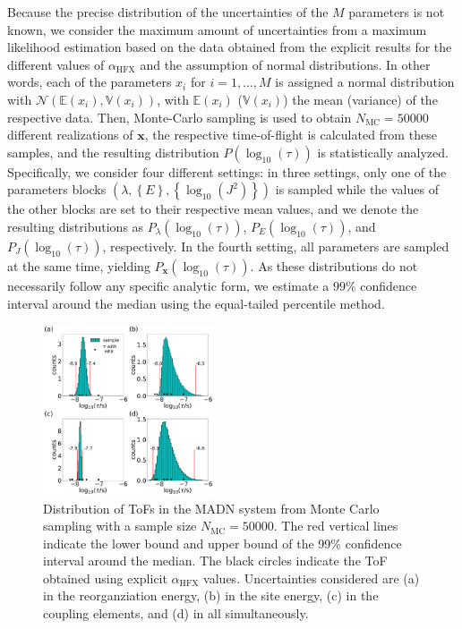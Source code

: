 \documentclass[%
 reprint,
superscriptaddress,
 amsmath,amssymb,
 aps,
prb,
floatfix
]{revtex4-2}
\newcommand{\ahfx}{\ensuremath{\alpha_\text{HFX}}\xspace}
\begin{document}
Because the precise distribution of the uncertainties of the $M$ parameters is not known, we consider the maximum amount of uncertainties from a maximum likelihood estimation based on the data obtained from the explicit results for the different values of \ahfx and the assumption of normal distributions. In other words, each of the parameters $x_i$ for $i=1,\ldots,M$ is assigned a normal distribution with $\mathcal{N}(\mathbb{E}(x_i),\mathbb{V}(x_i))$, with $\mathbb{E}(x_i)$ ($\mathbb{V}(x_i)$) the mean (variance) of the respective data. Then, Monte-Carlo sampling is used to obtain $N_\text{MC}=50000$ different realizations of $\mathbf{x}$, the respective time-of-flight is calculated from these samples, and the resulting distribution $P(\log_{10}(\tau))$ is statistically analyzed. Specifically, we consider four different settings: in three settings, only one of the parameters blocks $(\lambda,\left\{E\right\},\left\{\log_{10}(J^2)\right\})$ is sampled while the values of the other blocks are set to their respective mean values, and we denote the resulting distributions as $P_\lambda(\log_{10}(\tau))$, $P_E(\log_{10}(\tau))$, and $P_J(\log_{10}(\tau))$, respectively. In the fourth setting, all parameters are sampled at the same time, yielding $P_\mathbf{x}(\log_{10}(\tau))$. As these distributions do not necessarily follow any specific analytic form, we estimate a $99\%$ confidence interval around the median using the equal-tailed percentile method. 

\begin{figure}[tbp]
  \centering
  \includegraphics[width=0.45\textwidth]{fig6.pdf}
  \caption{Distribution of ToFs in the MADN system from  Monte Carlo sampling with a sample size $N_\text{MC}=50000$. The red vertical lines indicate the lower bound and upper bound of the 99\% confidence interval around the median. The black circles indicate the ToF obtained using explicit \ahfx values. Uncertainties considered are (a) in the reorganziation energy, (b) in the site energy, (c) in the coupling elements, and (d) in all simultaneously.}
  \label{fig:mle_MADN_withE}
\end{figure}
\end{document}

